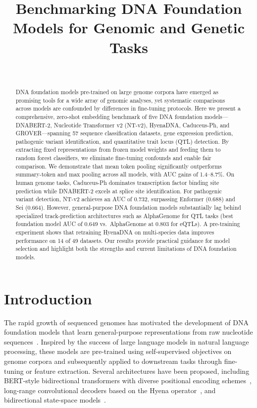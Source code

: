 \documentclass[11pt]{article}
\title{Benchmarking DNA Foundation Models for Genomic and Genetic Tasks}
\author{~}
\date{}
\begin{document}
\maketitle

\begin{abstract}
DNA foundation models pre-trained on large genome corpora have emerged as promising tools for a wide array of genomic analyses, yet systematic comparisons across models are confounded by differences in fine-tuning protocols.  Here we present a comprehensive, zero-shot embedding benchmark of five DNA foundation models---DNABERT-2, Nucleotide Transformer v2 (NT-v2), HyenaDNA, Caduceus-Ph, and GROVER---spanning 57 sequence classification datasets, gene expression prediction, pathogenic variant identification, and quantitative trait locus (QTL) detection.  By extracting fixed representations from frozen model weights and feeding them to random forest classifiers, we eliminate fine-tuning confounds and enable fair comparison.  We demonstrate that mean token pooling significantly outperforms summary-token and max pooling across all models, with AUC gains of 1.4--8.7\%.  On human genome tasks, Caduceus-Ph dominates transcription factor binding site prediction while DNABERT-2 excels at splice site identification.  For pathogenic variant detection, NT-v2 achieves an AUC of 0.732, surpassing Enformer (0.688) and Sei (0.664).  However, general-purpose DNA foundation models substantially lag behind specialized track-prediction architectures such as AlphaGenome for QTL tasks (best foundation model AUC of 0.649 vs.\ AlphaGenome at 0.803 for eQTLs).  A pre-training experiment shows that retraining HyenaDNA on multi-species data improves performance on 14 of 49 datasets.  Our results provide practical guidance for model selection and highlight both the strengths and current limitations of DNA foundation models.
\end{abstract}

\section{Introduction}

The rapid growth of sequenced genomes has motivated the development of DNA foundation models that learn general-purpose representations from raw nucleotide sequences~\citep{ji2021dnabert,devlin2019bert,vaswani2017attention}.  Inspired by the success of large language models in natural language processing, these models are pre-trained using self-supervised objectives on genome corpora and subsequently applied to downstream tasks through fine-tuning or feature extraction.  Several architectures have been proposed, including BERT-style bidirectional transformers with diverse positional encoding schemes~\citep{zhou2023dnabert2,dalla2023nucleotide,sanabria2024grover}, long-range convolutional decoders based on the Hyena operator~\citep{nguyen2024hyenadna,poli2023hyena}, and bidirectional state-space models~\citep{schiff2024caduceus,gu2024mamba}.
\end{document}
